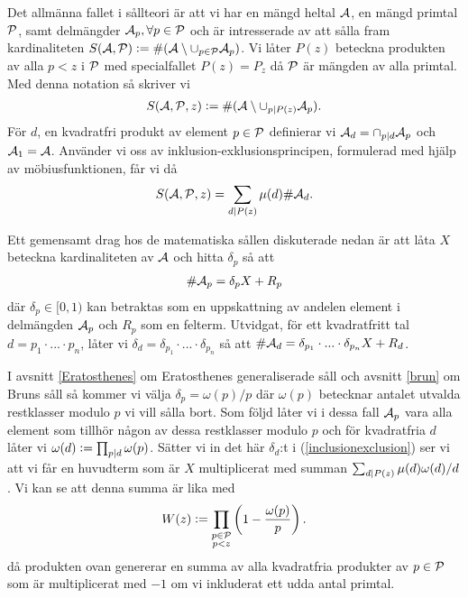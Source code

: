 Det allmänna fallet i sållteori är att vi har en mängd heltal \(\A\), en mängd primtal \(\P\), samt delmängder \(\A_p, \forall p \in \P\) och är intresserade av att sålla fram kardinaliteten \(S(\A, \P) :=\card{(\A \setminus \cup_{p \in \P} \A_p)}\). Vi låter \(P(z)\) beteckna produkten av alla \(p < z\) i \(\P\) med specialfallet \(P(z) = P_z\) då \(\P\) är mängden av alla primtal. Med denna notation så skriver vi 
\begin{align*}
    \S{A}{P}{z} := \card{(\A \setminus \cup_{p \divides P(z)} \A_p)} .
\end{align*}
För \(d\), en kvadratfri produkt av element \(p \in \P\) definierar vi \(\A_d = \cap_{p \divides d} \A_p\) och \(\A_1 = \A\). Använder vi oss av inklusion-exklusionsprincipen, formulerad med hjälp av möbiusfunktionen, får vi då
\begin{align} \label{inclusionexclusion}
    \S{A}{P}{z} = \sum_{d \divides P(z)} \mu(d) \card{\A_d} .
\end{align} %

Ett gemensamt drag hos de matematiska sållen diskuterade nedan är att låta \(X\) beteckna kardinaliteten av \(\A\) och hitta \(\delta_p\) så att
\begin{align} \label{deltaX}
    \card{\A_p} = \delta_p X + R_p
\end{align}
där \(\delta_p \in [0, 1)\) kan betraktas som en uppskattning av andelen element i delmängden \(\A_p\) och \(R_p\) som en felterm. Utvidgat, för ett kvadratfritt tal \(d = p_1 \cdot ... \cdot p_n\), låter vi \(\delta_{d} = \delta_{p_1} \cdot ... \cdot \delta_{p_n}\) så att \(\card{\A_{d}} = \delta_{p_1} \cdot ... \cdot \delta_{p_n} X + R_{d}\). 

I avsnitt \ref{Eratosthenes} om Eratosthenes generaliserade såll och avsnitt \ref{brun} om Bruns såll så kommer vi välja \(\delta_p = \omega(p) / p\) där \(\omega(p)\) betecknar antalet utvalda restklasser modulo \(p\) vi vill sålla bort. Som följd låter vi i dessa fall \(\A_p\) vara alla element som tillhör någon av dessa restklasser modulo $p$ och för kvadratfria $d$ låter vi \(\omega(d) := \prod_{p \divides d} \omega(p)\).  Sätter vi in det här $\delta_d$:t i (\ref{inclusionexclusion}) ser vi att vi får en huvudterm som är $X$ multiplicerat med summan \(\sum_{d \divides P(z)} \mu(d) \omega(d)/d\). Vi kan se att denna summa är lika med
\begin{align} \label{Wfunc}
    W(z) := \prod_{\substack{p \in \P \\ p < z}}\left(1 - \frac{\omega(p)}{p}\right).
\end{align} 
då produkten ovan genererar en summa av alla kvadratfria produkter av \(p \in \P\) som är multiplicerat med $-1$ om vi inkluderat ett udda antal primtal.

